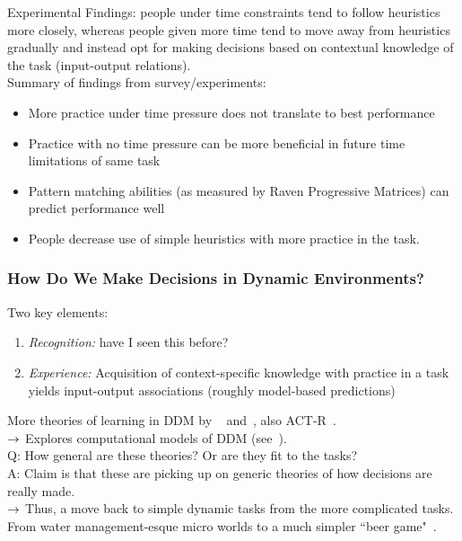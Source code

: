 Experimental Findings: people under time constraints tend to follow heuristics more closely, whereas people given more time tend to move away from heuristics gradually and instead opt for making decisions based on contextual knowledge of the task (input-output relations). \\

Summary of findings from survey/experiments:
\begin{itemize}
    \item More practice under time pressure does not translate to best performance
    \item Practice with no time pressure can be more beneficial in future time limitations of same task
    \item Pattern matching abilities (as measured by Raven Progressive Matrices) can predict performance well
    \item People decrease use of simple heuristics with more practice in the task.
\end{itemize}

\subsubsection{How Do We Make Decisions in Dynamic Environments?}

Two key elements:
\begin{enumerate}
    \item {\it Recognition:} have I seen this before?
    \item {\it Experience:} Acquisition of context-specific knowledge with practice in a task yields input-output associations (roughly model-based predictions)
\end{enumerate}

More theories of learning in DDM by ~\citet{dienes1995role,gonzalez2003instance} and~\citet{gibson1997learning}, also ACT-R~\cite{anderson1997act}. \\

$\rightarrow$ Explores computational models of DDM (see~\citet{gonzalez2003instance}). \\

Q: How general are these theories? Or are they fit to the tasks? \\

A: Claim is that these are picking up on generic theories of how decisions are really made. \\

$\rightarrow$ Thus, a move back to simple dynamic tasks from the more complicated tasks. From water management-esque micro worlds to a much simpler ``beer game"~\cite{brunstein2010effects}. \\

